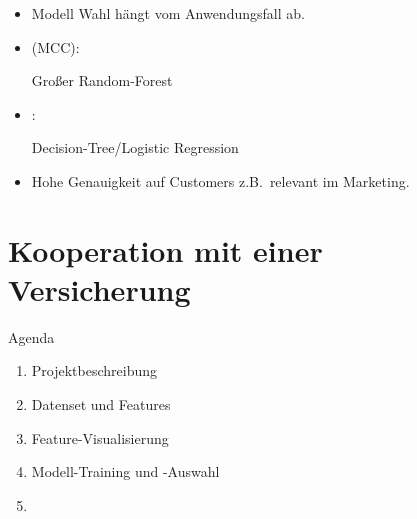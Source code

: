 \begin{frame}
\centering
{}
{
\begin{itemize}
\item Modell Wahl hängt vom Anwendungsfall ab.
\item {} (MCC):

 Großer Random-Forest
\item {}:

Decision-Tree/Logistic Regression
\item Hohe Genauigkeit auf Customers z.B.\ relevant im Marketing.
\end{itemize}
}
\end{frame}

\section{Kooperation mit einer Versicherung}

\begin{frame}{Agenda}
\centering
\myBlock[0.6]{}
{
\begin{enumerate}
\item Projektbeschreibung
\item Datenset und Features
\item Feature-Visualisierung
\item Modell-Training und -Auswahl
\item {}
\end{enumerate}
}
\end{frame}

